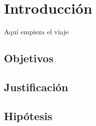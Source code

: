 \chapter{Introducción}

Aquí empieza el viaje	

\section{Objetivos}

\section{Justificación}

\section{Hipótesis}

